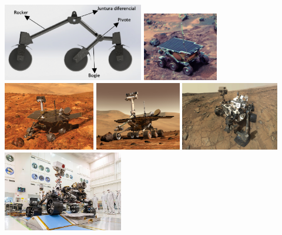 \documentclass[12pt]{article}
\begin{document}
\begin{minipage}{.4\textwidth}
  \includegraphics[width=\linewidth,height=3.4cm]{fig/rb-suspension.png}
  \includegraphics[width=.49\linewidth,height=3cm]{fig/sojourner.jpg}
  \includegraphics[width=.49\linewidth,height=3cm,trim={6cm 0 0 0},clip]{fig/spirit.jpg}
  \includegraphics[width=.49\linewidth,height=3cm]{fig/opportunity.jpg}
  \includegraphics[width=.49\linewidth,height=3cm,trim={12cm 0 7cm 0},clip]{fig/curiosity.jpg}
  \includegraphics[width=\linewidth,height=3.5cm,trim={0 2.7cm 0 1.5cm},clip]{fig/perseverance.jpg}
  \label{fig:int-1}
\end{minipage}
\end{document}
